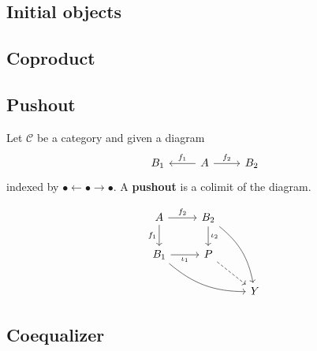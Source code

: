 \documentclass[12pt, oneside]{book}
\begin{document}
\subsection{Initial objects}
\subsection{Coproduct}
\subsection{Pushout}
\begin{definition}
    Let $\mathcal{C}$ be a category and given a diagram
    \begin{equation*}
        \begin{tikzcd}
            B_1 & \arrow[l,"f_1"']A\arrow[r,"f_2"] &  B_2
        \end{tikzcd}
    \end{equation*}
    indexed by $\bullet \leftarrow \bullet \rightarrow \bullet$.
    A \textbf{pushout} is a colimit of the diagram.
    \begin{remark}
        \begin{equation*}
            \begin{tikzcd}
                A \arrow[r,"f_2"] \arrow[d,"f_1"'] & B_2\arrow[ddr,bend left=20,""] \arrow[d,"\iota_2"]& \\
                B_1 \arrow[rrd,bend right=20,""]\arrow[r,"\iota_1"'] & P \arrow[rd,dashed,""]&\\
                && Y
            \end{tikzcd}
        \end{equation*}
    \end{remark}
\end{definition}
\subsection{Coequalizer}
\end{document}
